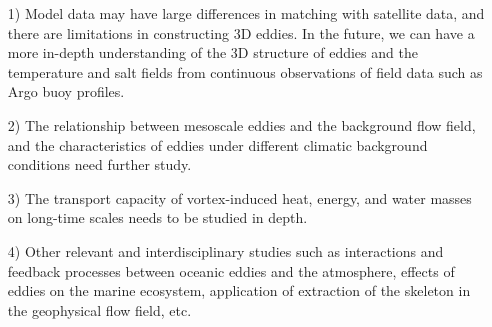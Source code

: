 \begin{itemize}
  \item [1)] 
  Model data may have large differences in matching with satellite data, and there are limitations in constructing 3D eddies. In the future, we can have a more in-depth understanding of the 3D structure of eddies and the temperature and salt fields from continuous observations of field data such as Argo buoy profiles.
  \item [2)]
  The relationship between mesoscale eddies and the background flow field, and the characteristics of eddies under different climatic background conditions need further study.
  \item [3)]
  The transport capacity of vortex-induced heat, energy, and water masses on long-time scales needs to be studied in depth.
  \item[4)]
  Other relevant and interdisciplinary studies such as interactions and feedback processes between oceanic eddies and the atmosphere, effects of eddies on the marine ecosystem, application of extraction of the skeleton in the geophysical flow field, etc.
\end{itemize}




\newpage

